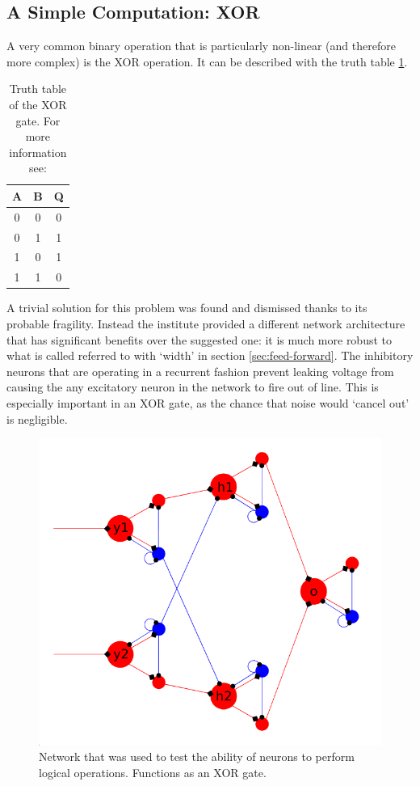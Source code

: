\documentclass[a4paper,twocolumn]{article}
\begin{document}
\subsection{A Simple Computation: XOR}
A very common binary operation that is particularly non-linear (and therefore
more complex) is the XOR operation. It can be described with the truth table
\ref{tab:XOR}.
\begin{table}
    \centering
    \begin{tabular}{c | c | c}
        A & B & Q \\ \hline
        0 & 0 & 0 \\
        0 & 1 & 1 \\
        1 & 0 & 1 \\
        1 & 1 & 0
    \end{tabular}
    \caption{Truth table of the XOR gate. For more information see:
    \cite{horowitz_hill_2020}}
    \label{tab:XOR}
\end{table}
A trivial solution for this problem was found and dismissed thanks to its
probable fragility.  Instead the institute provided a different network
architecture that has significant benefits over the suggested one: it is much
more robust to what is called referred to with `width' in section
\ref{sec:feed-forward}. The inhibitory neurons that are operating in a recurrent
fashion prevent leaking voltage from causing the any excitatory neuron in the
network to fire out of line. This is especially important in an XOR gate, as the
chance that noise would `cancel out' is negligible.

\begin{figure}
    \centering
    \includegraphics[width=.5\textwidth]{figures/XOR-used.png}
    \caption{Network that was used to test the ability of neurons to perform
        logical operations. Functions as an XOR gate.}
    \label{fig:XOR-used}
\end{figure}
\end{document}
